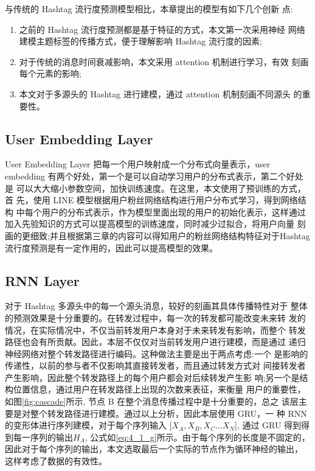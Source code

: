 与传统的 Hashtag 流行度预测模型相比，本章提出的模型有如下几个创新 点:
\begin{enumerate}
\item 之前的 Hashtag 流行度预测都是基于特征的方式，本文第一次采用神经 网络建模主题标签的传播方式，便于理解影响 Hashtag 流行度的因素;
\item 对于传统的消息时间衰减影响，本文采用 attention 机制进行学习，有效 刻画每个元素的影响;
\item 本文对于多源头的 Hashtag 进行建模，通过 attention 机制刻画不同源头 的重要性。

\end{enumerate}

\subsection{User Embedding Layer}
User Embedding Layer 把每一个用户映射成一个分布式向量表示，user embedding 有两个好处，第一个是可以自动学习用户的分布式表示，第二个好处是 可以大大缩小参数空间，加快训练速度。在这里，本文使用了预训练的方式，首 先，使用 LINE 模型根据用户粉丝网络结构进行用户分布式学习，得到网络结构 中每个用户的分布式表示，作为模型里面出现的用户的初始化表示，这样通过 加入先验知识的方式可以提高模型的训练速度，同时减少过拟合，将用户向量 刻画的更细致;并且根据第三章的内容可以得知用户的粉丝网络结构特征对于Hashtag 流行度预测是有一定作用的，因此可以提高模型的效果。

\subsection{RNN Layer}

对于 Hashtag 多源头中的每一个源头消息，较好的刻画其具体传播特性对于 整体的预测效果是十分重要的。在转发过程中，每一次的转发都可能改变未来转 发的情况，在实际情况中，不仅当前转发用户本身对于未来转发有影响，而整个 转发路径也会有所贡献。因此，本层不仅仅对当前转发用户进行建模，而是通过 递归神经网络对整个转发路径进行编码。这种做法主要是出于两点考虑:一个 是影响的传递性，以前的参与者不仅影响其直接转发者，而且通过转发方式对 间接转发者产生影响，因此整个转发路径上的每个用户都会对后续转发产生影 响;另一个是结构位置信息，通过用户在转发路径上出现的次数来表征，来衡量 用户的重要性，如图\ref{fig:cascade}所示, 节点 B 在整个消息传播过程中是十分重要的，总之 该层主要是对整个转发路径进行建模。通过以上分析，因此本层使用 GRU，一 种 RNN 的变形体进行序列建模，对于每个序列输入 [$X_{A},X_{B},X_{C}...X_{N}$], 通过 GRU 得到得到每一序列的输出$H_{A}$, 公式如\ref{eq:4_1_g}所示。由于每个序列的长度是不固定的， 因此对于每个序列的输出，本文选取最后一个实际的节点作为循环神经的输出， 这样考虑了数据的有效性。

